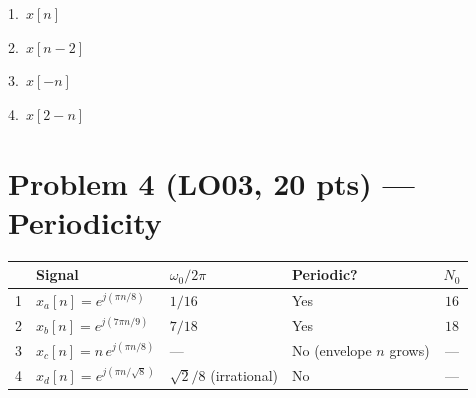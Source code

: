 \vspace{-2pt}
\begin{center}
\begin{minipage}{0.48\textwidth}\centering
  {\footnotesize 1.\ $x[n]$}\\
\end{minipage}\hfill
\begin{minipage}{0.48\textwidth}\centering
  {\footnotesize 2.\ $x[n-2]$}\\
\end{minipage}

\vspace{4pt}
\begin{minipage}{0.48\textwidth}\centering
  {\footnotesize 3.\ $x[-n]$}\\
\end{minipage}\hfill
\begin{minipage}{0.48\textwidth}\centering
  {\footnotesize 4.\ $x[2-n]$}\\
\end{minipage}
\end{center}

\section*{Problem 4 \normalsize(LO03, 20 pts) --- Periodicity}

\begin{center}
\begin{tabular}{clllc}
  \toprule
  & Signal & $\omega_0/2\pi$ & Periodic? & $N_0$ \\
  \midrule
  1 & $x_a[n] = e^{j(\pi n/8)}$        & $1/16$        & Yes & $16$ \\
  2 & $x_b[n] = e^{j(7\pi n/9)}$       & $7/18$        & Yes & $18$ \\
  3 & $x_c[n] = n\,e^{j(\pi n/8)}$     & ---           & No (envelope $n$ grows) & --- \\
  4 & $x_d[n] = e^{j(\pi n/\sqrt{8})}$ & $\sqrt{2}/8$ (irrational) & No & --- \\
  \bottomrule
\end{tabular}
\end{center}

